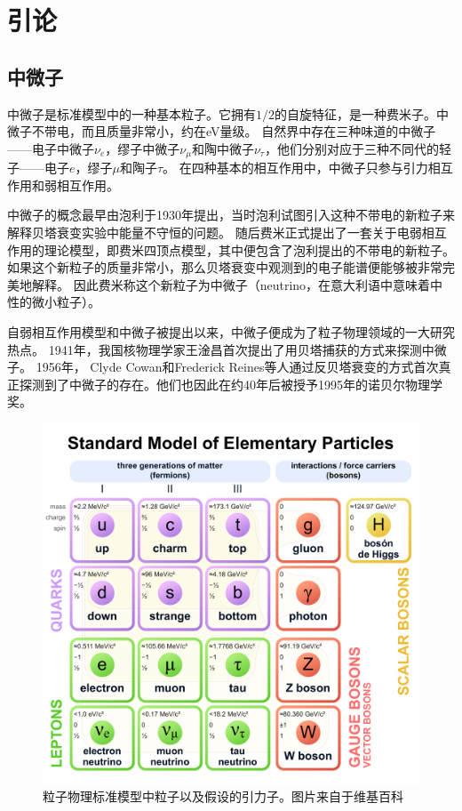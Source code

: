 \chapter{引论}
\label{chap:introduction}

\section{中微子}

中微子是标准模型中的一种基本粒子\cite{Griffiths:2008}。它拥有$1/2$的自旋特征，是一种费米子。中微子不带电，而且质量非常小，约在eV量级。
自然界中存在三种味道的中微子——电子中微子$\nu_e$，缪子中微子$\nu_\mu$和陶中微子$\nu_\tau$，他们分别对应于三种不同代的轻子——电子$e$，缪子$\mu$和陶子$\tau$。
在四种基本的相互作用中，中微子只参与引力相互作用和弱相互作用。

中微子的概念最早由泡利于1930年提出，当时泡利试图引入这种不带电的新粒子来解释贝塔衰变实验中能量不守恒的问题。
随后费米正式提出了一套关于电弱相互作用的理论模型，即费米四顶点模型，其中便包含了泡利提出的不带电的新粒子。
如果这个新粒子的质量非常小，那么贝塔衰变中观测到的电子能谱便能够被非常完美地解释。
因此费米称这个新粒子为中微子（neutrino，在意大利语中意味着中性的微小粒子）。

自弱相互作用模型和中微子被提出以来，中微子便成为了粒子物理领域的一大研究热点。
1941年，我国核物理学家王淦昌首次提出了用贝塔捕获的方式来探测中微子\cite{Wang:1942}。
1956年， Clyde Cowan和Frederick Reines等人通过反贝塔衰变的方式首次真正探测到了中微子的存在\cite{Cowan:1956}。他们也因此在约40年后被授予1995年的诺贝尔物理学奖。

\begin{figure}[htb]
    \centering
    \includegraphics[width=0.85\linewidth]{img/standard_model.pdf}
    \caption{粒子物理标准模型中粒子以及假设的引力子。图片来自于维基百科}
    \label{fig:standard_model}
\end{figure}

